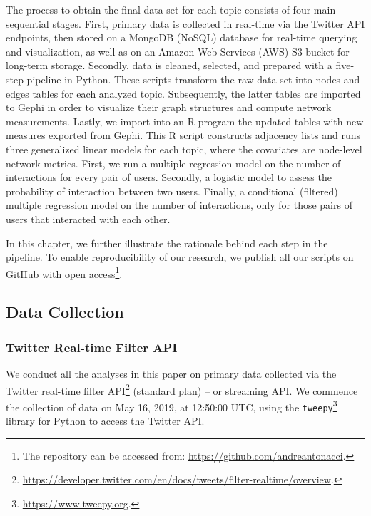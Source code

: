 The process to obtain the final data set for each topic consists of four main sequential stages.
First, primary data is collected in real-time via the Twitter API endpoints, then stored on a MongoDB (NoSQL) database for real-time querying and visualization, as well as on an Amazon Web Services (AWS) S3 bucket for long-term storage.
Secondly, data is cleaned, selected, and prepared with a five-step pipeline in Python. These scripts transform the raw data set into nodes and edges tables for each analyzed topic.
Subsequently, the latter tables are imported to Gephi in order to visualize their graph structures and compute network measurements.
Lastly, we import into an R program the updated tables with new measures exported from Gephi. This R script constructs adjacency lists and runs three generalized linear models for each topic, where the covariates are node-level network metrics. First, we run a multiple regression model on the number of interactions for every pair of users. Secondly, a logistic model to assess the probability of interaction between two users. Finally, a conditional (filtered) multiple regression model on the number of interactions, only for those pairs of users that interacted with each other.

In this chapter, we further illustrate the rationale behind each step in the pipeline. To enable reproducibility of our research, we publish all our scripts on GitHub with open access\footnote{The repository can be accessed from: \url{https://github.com/andreantonacci}.}.
\subsection{Data Collection}
\subsubsection{Twitter Real-time Filter API}
We conduct all the analyses in this paper on primary data collected via the Twitter real-time filter API\footnote{\url{https://developer.twitter.com/en/docs/tweets/filter-realtime/overview}.} (standard plan) – or streaming API. We commence the collection of data on May 16, 2019, at 12:50:00 UTC, using the \texttt{tweepy}\footnote{\url{https://www.tweepy.org}.} library for Python to access the Twitter API.

